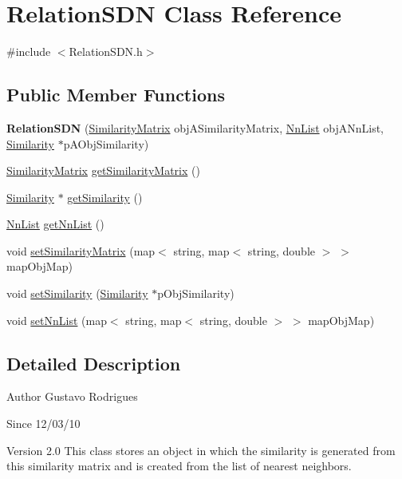 \hypertarget{classRelationSDN}{
\section{RelationSDN Class Reference}
\label{classRelationSDN}
}


{\ttfamily \#include $<$RelationSDN.h$>$}\subsection*{Public Member Functions}
\begin{DoxyCompactItemize}
\item 
\hypertarget{classRelationSDN_abc9dd5e8a1441965db4fe7d964ad9296}{
{\bfseries RelationSDN} (\hyperlink{classSimilarityMatrix}{SimilarityMatrix} objASimilarityMatrix, \hyperlink{classNnList}{NnList} objANnList, \hyperlink{classSimilarity}{Similarity} $\ast$pAObjSimilarity)}
\label{classRelationSDN_abc9dd5e8a1441965db4fe7d964ad9296}

\item 
\hyperlink{classSimilarityMatrix}{SimilarityMatrix} \hyperlink{classRelationSDN_a52f3944e7966f4ea3684069fff04e1a3}{getSimilarityMatrix} ()
\item 
\hyperlink{classSimilarity}{Similarity} $\ast$ \hyperlink{classRelationSDN_a8db644a112eae5dd35c2ca0e47d36ce1}{getSimilarity} ()
\item 
\hyperlink{classNnList}{NnList} \hyperlink{classRelationSDN_a7d4ae265a19587306975a8cdac7bb115}{getNnList} ()
\item 
void \hyperlink{classRelationSDN_a3a8936efd1fd9ae0736a4a5e360b34e6}{setSimilarityMatrix} (map$<$ string, map$<$ string, double $>$ $>$ mapObjMap)
\item 
void \hyperlink{classRelationSDN_ad16b958a06717abf76ff5a96d008534c}{setSimilarity} (\hyperlink{classSimilarity}{Similarity} $\ast$pObjSimilarity)
\item 
void \hyperlink{classRelationSDN_a403418b3fb4ec2be68f91d8b47428885}{setNnList} (map$<$ string, map$<$ string, double $>$ $>$ mapObjMap)
\end{DoxyCompactItemize}


\subsection{Detailed Description}
\begin{DoxyAuthor}{Author}
Gustavo Rodrigues 
\end{DoxyAuthor}
\begin{DoxySince}{Since}
12/03/10 
\end{DoxySince}
\begin{DoxyVersion}{Version}
2.0 This class stores an object in which the similarity is generated from this similarity matrix and is created from the list of nearest neighbors. 
\end{DoxyVersion}


